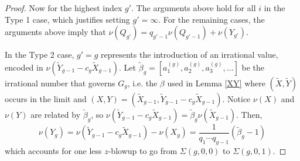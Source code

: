\documentclass[11pt]{amsart}
\theoremstyle{definition}
\begin{document}
{\begin{proof}
Now for the highest index $g'$. The arguments above hold for all $i$ in the Type 1 case, which justifies setting $g'=\infty$. For the remaining cases, the arguments above imply that $\nu(Q_{g'})=q_{g'-1}\nu(Q_{g'-1})+\nu(Y_{g'})$.

In the Type 2 case, $g'=g$ represents the introduction of an irrational value, encoded in $\displaystyle \nu\left(\tilde Y_{g-1}-c_g\tilde X_{g-1}\right)$. Let $\tilde \beta_g=\left[a_1^{(g)}, a_2^{(g)}, a_3^{(g)}, \ldots\right]$ be the irrational number that governs $G_g$, i.e. the $\beta$ used in Lemma \ref{XY} where $(\tilde X,\tilde Y)$ occurs in the limit and $(X,Y)=(\tilde X_{g-1},\tilde Y_{g-1}-c_g\tilde X_{g-1})$. Notice $\nu(X)$ and $\nu(Y)$ are related by $\tilde \beta_g$, so $\nu\left(\tilde Y_{g-1} - c_g \tilde X_{g-1}\right)=\tilde \beta_g \nu(\tilde X_{g-1})$. Then,
\begin{equation*}
\nu(Y_g)=\nu\left(\tilde Y_{g-1}-c_g\tilde X_{g-1}\right)-\nu(X_g)=\frac{1}{q_1\cdots q_{g-1}}\left(\tilde \beta_g-1\right)
\end{equation*}
which accounts for one less $z$-blowup to go from $\Sigma(g,0,0)$ to $\Sigma(g,0,1)$.


\end{proof}}
\end{document}
